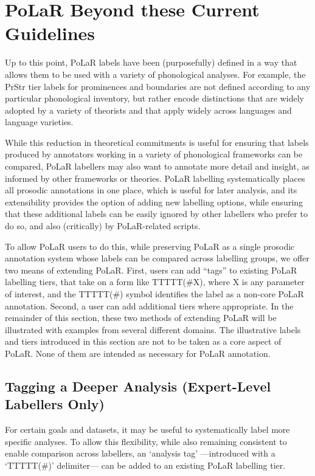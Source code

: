 \documentclass[11pt, twoside]{memoir}
\begin{document}
\chapter{PoLaR Beyond these Current Guidelines}\label{ch:beyond}
Up to this point, PoLaR labels have been (purposefully) defined in a way that allows them to be used with a variety of phonological analyses. For example, the PrStr tier labels for prominences and boundaries  are not defined according to any particular phonological inventory, but rather encode distinctions that are widely adopted by a variety of theorists and that apply widely across languages and language varieties.

While this reduction in theoretical commitments is useful for ensuring that labels produced by annotators working in a variety of phonological frameworks can be compared, PoLaR labellers may also want to annotate more detail and insight, as informed by other frameworks or theories. PoLaR labelling systematically places all prosodic annotations in one place, which is useful for later analysis, and its extensibility provides the option of adding new labelling options, while ensuring that these additional labels can be easily ignored by other labellers who prefer to do so, and also (critically) by PoLaR-related scripts.

To allow PoLaR users to do this, while preserving PoLaR as a single prosodic annotation system whose labels can be compared across labelling groups, we offer two means of extending PoLaR. First, users can add “tags” to existing PoLaR labelling tiers, that take on a form like TTTTT(\#X), where X is any parameter of interest, and the TTTTT(\#) symbol identifies the label as a non-core PoLaR annotation. Second, a user can add additional tiers where appropriate. In the remainder of this section, these two methods of extending PoLaR will be illustrated with examples from several different domains. The illustrative labels and tiers introduced in this section are not to be taken as a core aspect of PoLaR. None of them are intended as necessary for PoLaR annotation.

\section{Tagging a Deeper Analysis (Expert-Level Labellers Only)}\label{sec:tagging-a-deeper-analysis-expert-level-labellers-only}

For certain goals and datasets, it may be useful to systematically label more specific analyses. To allow this flexibility, while also remaining consistent to enable comparison across labellers, an ‘analysis tag’ —introduced with a ‘TTTTT(\#)’ delimiter— can be added to an existing PoLaR labelling tier.
\end{document}
